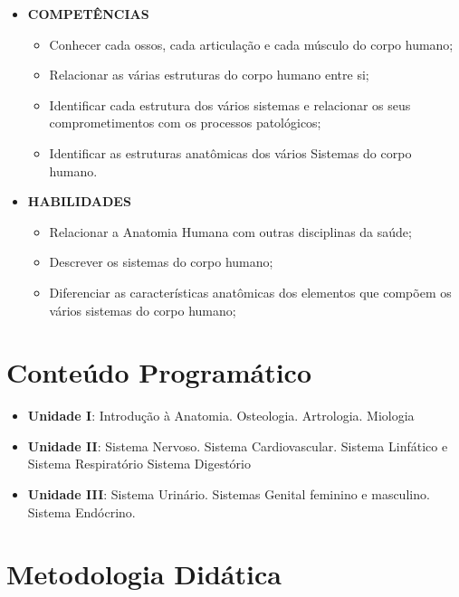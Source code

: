 \documentclass[
]{book}
\providecommand{\tightlist}{%
  \setlength{\itemsep}{0pt}\setlength{\parskip}{0pt}}
\begin{document}
\begin{itemize}
\tightlist
\item
  \textbf{COMPETÊNCIAS}

  \begin{itemize}
  \tightlist
  \item
    Conhecer cada ossos, cada articulação e cada músculo do corpo humano;
  \item
    Relacionar as várias estruturas do corpo humano entre si;
  \item
    Identificar cada estrutura dos vários sistemas e relacionar os seus comprometimentos com os processos patológicos;
  \item
    Identificar as estruturas anatômicas dos vários Sistemas do corpo humano.
  \end{itemize}
\item
  \textbf{HABILIDADES}

  \begin{itemize}
  \tightlist
  \item
    Relacionar a Anatomia Humana com outras disciplinas da saúde;
  \item
    Descrever os sistemas do corpo humano;
  \item
    Diferenciar as características anatômicas dos elementos que compõem os vários sistemas do corpo humano;
  \end{itemize}
\end{itemize}

\hypertarget{conteuxfado-programuxe1tico}{%
\section{Conteúdo Programático}\label{conteuxfado-programuxe1tico}}

\begin{itemize}
\tightlist
\item
  \textbf{Unidade I}: Introdução à Anatomia. Osteologia. Artrologia. Miologia
\item
  \textbf{Unidade II}: Sistema Nervoso. Sistema Cardiovascular. Sistema Linfático e Sistema Respiratório Sistema Digestório
\item
  \textbf{Unidade III}: Sistema Urinário. Sistemas Genital feminino e masculino. Sistema Endócrino.
\end{itemize}

\hypertarget{metodologia-diduxe1tica}{%
\section{Metodologia Didática}\label{metodologia-diduxe1tica}}
\end{document}
